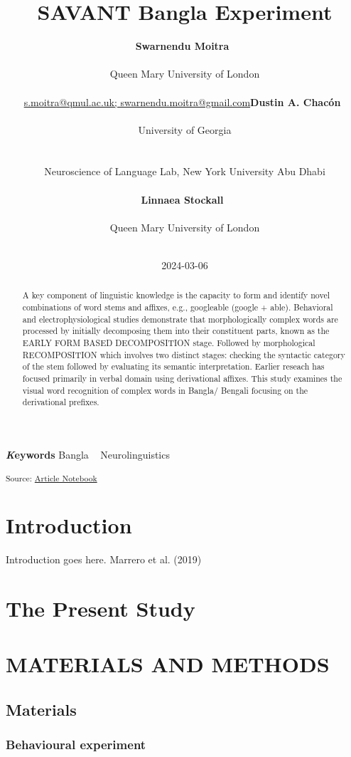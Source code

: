 \documentclass[
]{article}
\title{SAVANT Bangla Experiment}
\author{\textbf{Swarnendu
Moitra}~\orcidlink{0000-0001-6830-3284}\\\\Queen Mary University of
London\\\\\href{mailto:s.moitra@qmul.ac.uk;
swarnendu.moitra@gmail.com}{s.moitra@qmul.ac.uk;
swarnendu.moitra@gmail.com}\asep\textbf{Dustin A.
Chacón}~\orcidlink{0009-0002-8438-1914}\\\\University of
Georgia\\\\\\Neuroscience of Language Lab, New York University Abu
Dhabi\\\\\asep\textbf{Linnaea
Stockall}~\orcidlink{0000-0002-4700-5154}\\\\Queen Mary University of
London\\\\}
\date{2024-03-06}
\begin{document}
\maketitle
\begin{abstract}
A key component of linguistic knowledge is the capacity to form and
identify novel combinations of word stems and affixes, e.g., googleable
(google + able). Behavioral and electrophysiological studies demonstrate
that morphologically complex words are processed by initially
decomposing them into their constituent parts, known as the EARLY FORM
BASED DECOMPOSITION stage. Followed by morphological RECOMPOSITION which
involves two distinct stages: checking the syntactic category of the
stem followed by evaluating its semantic interpretation. Earlier reseach
has focused primarily in verbal domain using derivational affixes. This
study examines the visual word recognition of complex words in Bangla/
Bengali focusing on the derivational prefixes.
\end{abstract}
{\bfseries \emph Keywords}
\def\sep{\textbullet\ }
Bangla \sep 
Neurolinguistics


\textsubscript{Source:
\href{https://SwarMoi.github.io/Moitra-et-al_SAVANT/index-preview.html}{Article
Notebook}}

\section{Introduction}\label{introduction}

Introduction goes here. Marrero et al. (2019)

\section{The Present Study}\label{the-present-study}

\section{MATERIALS AND METHODS}\label{sec-data-methods}

\subsection{Materials}\label{materials}

\subsubsection{Behavioural experiment}\label{behavioural-experiment}
\end{document}
